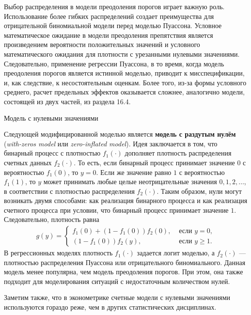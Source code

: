 Выбор распределения в модели преодоления порогов играет важную роль. Использование более гибких распределений создает преимущества для отрицательной биномиальной модели перед моделью Пуассона. Условное математическое ожидание в модели преодоления препятствия является произведением вероятности положительных значений и условного математического ожидания для плотности с урезанными нулевыми значениями. Следовательно, применение регрессии Пуассона, в то время, когда модель преодоления порогов является истинной моделью, приводит к мисспецификации, и, как следствие, к несостоятельным оценкам. Более того, из-за формы условного среднего, расчет предельных эффектов оказывается сложнее, аналогично модели, состоящей из двух частей, из раздела 16.4.

        \begin{center}{Модель с нулевыми значениями}\end{center}
\noindent
Следующей модифицированной моделью является \textbf{модель с раздутым нулём} (\textit{with-zeros model} или \textit{zero-inflated model}). Идея заключается в том, что бинарный процесс с плотностью $f_1(\cdot)$ дополняет плотность распределения счетных данных $f_2(\cdot)$. То есть, если бинарный процесс принимает значение $0$ с вероятностью $f_1(0)$, то $y = 0$. Если же значение равно $1$ с вероятностью $f_1(1)$, то $y$ может принимать любые целые неотрицательные значения $0, 1, 2, \ldots $, в соответствии с плотностью распределения $f_2(\cdot)$. Таким образом, нули могут возникать двумя способами: как реализация бинарного процесса и как реализация счетного процесса при условии, что бинарный процесс принимает значение $1$. Следовательно, плотность равна
    \begin{align}\label{eq:20.19}
    g(y) =\begin{cases}
                f_1(0) + (1 - f_1(0)) f_2(0),              & \text{ если }y = 0, \\
                (1 - f_1(0))f_2(y),                        & \text{ если }y \ge 1.
                \end{cases}
    \end{align}
В регрессионных моделях плотность $f_1(\cdot)$ задается логит моделью, а $f_2(\cdot)$ --- плотностью распределения Пуассона или отрицательного биномиального. Данная модель менее популярна, чем модель преодоления порогов. При этом, она также подходит для моделирования ситуаций с недостаточным количеством нулей.

Заметим также, что в эконометрике счетные модели с нулевыми значениями используются гораздо реже, чем в других статистических дисциплинах.


